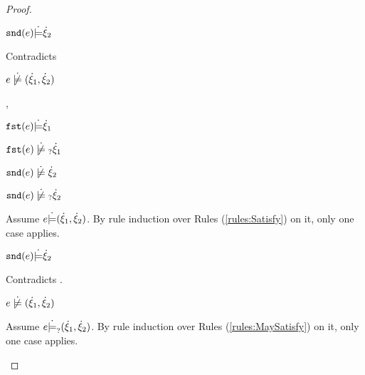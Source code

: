 \begin{proof}
\begin{byCases}
\begin{byCases}
\begin{byCases}
\begin{byCases}
                \begin{pfsteps*}
                \item $\mathtt{snd}(e) \dot{\models} \dot{\xi}_2$ 
                \end{pfsteps*}
                Contradicts 
            \end{byCases}
            \begin{pfsteps*}
            \item $\cnotsatisfy{e}{\cpair{\hxi_1}{\hxi_2}}$  
            \end{pfsteps*}
            
        \item[\csatisfy{\hfst{e}}{\hxi_1},\cnotsatisfyormay{\hsnd{e}}{\hxi_2}]
            \begin{pfsteps*}
            \item $\mathtt{fst}(e) \dot{\models} \dot{\xi}_1$  
            \item $\cnotmaysatisfy{\hfst{e}}{\hxi_1}$  
            \item $\cnotsatisfy{\hsnd{e}}{\hxi_2}$  
            \item $\cnotmaysatisfy{\hsnd{e}}{\hxi_2}$  
            \end{pfsteps*}
            Assume $e \dot{\models} (\dot{\xi}_1 , \dot{\xi}_2)$. By rule induction over Rules (\ref{rules:Satisfy}) on it, only one case applies.
            \begin{byCases}
            \item[\text{(\ref{rule:CSNotIntroPair})}]
                \begin{pfsteps*}
                \item $\mathtt{snd}(e) \dot{\models} \dot{\xi}_2$ 
                \end{pfsteps*}
                Contradicts .
            \end{byCases}
            \begin{pfsteps*}
            \item $\cnotsatisfy{e}{\cpair{\hxi_1}{\hxi_2}}$  
            \end{pfsteps*}
            Assume $e \dot{\models}_{?} (\dot{\xi}_1 , \dot{\xi}_2)$. By rule induction over Rules (\ref{rules:MaySatisfy}) on it, only one case applies.

\end{byCases}
\end{byCases}
\end{byCases}
\end{proof}
